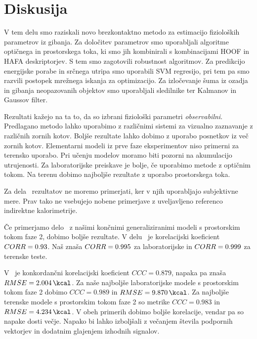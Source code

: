 \chapter{Diskusija}\label{sec:diskusija}
V tem delu smo raziskali novo brezkontaktno metodo za estimacijo fizioloških parametrov iz gibanja. Za določitev parametrov smo uporabljali algoritme optičnega in prostorskega toka, ki smo jih kombinirali s kombinacijami HOOF in HAFA deskriptorjev. S tem smo zagotovili robustnost algoritmov. Za predikcijo energijske porabe in srčnega utripa smo uporabili SVM regresijo, pri tem pa smo razvili \nurbf postopek mrežnega iskanja za optimizacijo. Za izločevanje šuma iz ozadja in gibanja neopazovanih objektov smo uporabljali sledilnike ter Kalmanov in Gaussov filter.

Rezultati kažejo na ta to, da so izbrani fiziološki parametri \emph{observabilni}. Predlagano metodo lahko uporabimo z različnimi sistemi za vizualno zaznavanje z različnih zornih kotov. Boljše rezultate lahko dobimo z uporabo posnetkov iz več zornih kotov. Elementarni modeli iz prve faze eksperimentov niso primerni za terensko uporabo. Pri učenju modelov moramo biti pozorni na akumulacijo utrujenosti. Za laboratorijske preiskave je bolje, če uporabimo metode z optičnim tokom. Na terenu dobimo najboljše rezultate z uporabo prostorskega toka.

Za dela~\cite{peker2004framework,silva2015assessing,osgnach2010energy} rezultatov ne moremo primerjati, ker v njih uporabljajo subjektivne mere. Prav tako ne vsebujejo nobene primerjave z uveljavljeno referenco indirektne kalorimetrije.

Če primerjamo delo~\cite{botton2011energy} z našimi končnimi generaliziranimi modeli s prostorskim tokom faze 2, dobimo boljše rezultate. V delu~\cite{botton2011energy} je korelacijski koeficient ${CORR}=\num{0.93}$. Naš znaša ${CORR}=\num{0.995}$ za laboratorijske in ${CORR}=\num{0.999}$ za terenske teste. 

V~\cite{nathan2015estimating} je konkordančni korelacijski koeficient $CCC=\num{0.879}$, napaka pa znaša $\rmse=\SI{2.004}{\kcal}$. Za naše najboljše laboratorijske modele s prostorskim tokom faze 2 dobimo $CCC=\num{0.989}$ in $\rmse=\SI{9.870}{\kcal}$. Za najboljše terenske modele s prostorskim tokom faze 2 so metrike  $CCC=\num{0.983}$ in $\rmse=\SI{4.234}{\kcal}$. V obeh primerih dobimo boljše korelacije, vendar pa so napake dosti večje. Napako bi lahko izboljšali z večanjem števila podpornih vektorjev in dodatnim glajenjem izhodnih signalov.

